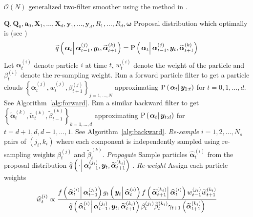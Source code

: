 \documentclass[notitlepage]{article}
\newcommand\StateXX{\Statex\hspace{\algorithmicindent}\hspace{\algorithmicindent}}
\renewcommand{\vec}[1]{\bm{#1}}
\newcommand{\mat}[1]{\mathbf{#1}}
\newcommand{\Lbrace}[1]{\left\{ #1\right\}}
\newcommand{\Lparen}[1]{\left( #1\right)}
\newcommand{\Cond}[2]{\left. #1 \vphantom{#2} \right\vert  #2}
\newcommand{\Prob}{\text{P}}
\newcommand{\optor}[2]{#1\Lparen{#2}}
\newcommand{\optorC}[3]{\optor{#1}{\Cond{#2}{#3}}}
\newcommand{\propC}[2]{\optorC{\Prob}{#1}{#2}}
\newcommand{\gFunc}[3]{\optorC{g_{#3}}{#1}{#2}}
\newcommand{\fFunc}[2]{\optorC{f}{#1}{#2}}
\newcommand{\IDAproxC}[2]{\optorC{\widetilde{q}}{#1}{#2}}
\newcommand{\partic}[3]{#1_{#2}^{\Lparen{#3}}}
\newcommand{\particB}[3]{\widetilde{#1}_{#2}^{\Lparen{#3}}}
\newcommand{\particS}[3]{\widehat{#1}_{#2}^{\Lparen{#3}}}
\newcommand{\bigO}[1]{\mathcal{O}\Lparen{#1}}
\newcommand{\nPart}{N}
\newcommand{\nPeriods}{d}
\begin{document}
\newpage

\begin{algorithm}[H]
\caption{$\bigO{\nPart}$ generalized two-filter smoother using the method in \cite{fearnhead10}.}\label{alg:ONsmoother}
\begin{algorithmic}[1]\raggedright
\INPUT
\Statex $\mat{Q},\mat{Q}_0,\vec{a}_0,\mat{X}_1,\dots,\mat{X}_d,\vec{y}_1,\dots,\vec{y}_d,R_1,\dots,R_d,\vec{\omega}$
%
\Statex Proposal distribution which optimally is (see \citet[page 453]{fearnhead10})
\Statex \begin{equation}
	\IDAproxC{\vec{\alpha}_t}{\partic{\vec{\alpha}}{t-1}{j},\vec{y}_t, \particB{\vec{\alpha}}{t+1}{k}} =
%
	\propC{\vec{\alpha}_t}{\partic{\vec{\alpha}}{t-1}{j},\vec{y}_t, \particB{\vec{\alpha}}{t+1}{k}}
\end{equation}
%
%
\Statex Let $\partic{\vec{\alpha}}{t}{i}$ denote particle $i$ at time $t$, $\partic{w}{t}{i}$ denote the weight of the particle and $\partic{\beta}{t}{i}$ denote the re-sampling weight.
%
\State Run a forward particle filter to get a particle clouds %
	$\Lbrace{\partic{\vec{\alpha}}{t}{j}, \partic{w}{t}{j}, \partic{\beta}{t + 1}{j}}_{j=1,\dots,\nPart}$ %
	approximating $\propC{\vec{\alpha}_t}{\vec{y}_{1:t}}$ for $t = 0, 1, \dots, \nPeriods$. See Algorithm~\ref{alg:forward}.
\EndProcedure
%
\State Run a similar backward filter to get %
	$\Lbrace{\particB{\vec{\alpha}}{t}{k}, \particB{w}{t}{k}, \particB{\beta}{t - 1}{k}}_{k=1,\dots,\nPeriods}$  %
	approximating $\propC{\vec{\alpha}_t}{\vec{y}_{t:\nPeriods}}$ for $t = \nPeriods + 1, \nPeriods, \nPeriods - 1, \dots, 1$. See Algorithm~\ref{alg:backward}.
\EndProcedure
%
\For{$t=1,\dots, \nPart$}
\StateXX \emph{Re-sample}
\State $i=1,2,\dots,\nPart_s$ pairs of $\Lparen{j_i, k_i}$ where each component is independently sampled using re-sampling weights $\partic{\beta}{t}{j}$ and $\particB{\beta}{t}{k}$.
%
\StateXX \emph{Propagate}
\State Sample particles $\particS{\vec{\alpha}}{t}{i}$ from the proposal distribution %
	$\IDAproxC{\cdot}{\partic{\vec{\alpha}}{t-1}{j_i},\vec{y}_t, \particB{\vec{\alpha}}{t + 1}{k_i}}$%
.%
\StateXX \emph{Re-weight}
\State Assign each particle weights
\StateXX \begin{equation}\label{eqn:combineWeight}
 \particS{w}{t}{i} \propto \frac{
 	\fFunc{\particS{\vec{\alpha}}{t}{i}}{\partic{\vec{\alpha}}{t - 1}{j_i}}
 	\gFunc{\vec{y}_t}{\particS{\vec{\alpha}}{t}{i}}{t}
 	\fFunc{\particB{\vec{\alpha}}{t + 1}{k_i}}{\particS{\vec{\alpha}}{t}{i}}
 	\partic{w}{t - 1}{j_i}\particB{w}{t + 1}{k_i}
 	}{ %
 	\IDAproxC{\particS{\vec{\alpha}}{t}{i}}{\partic{\vec{\alpha}}{t-1}{j_i},\vec{y}_t, \particB{\vec{\alpha}}{t+1}{k_i}}
 	\partic{\beta}{t}{j_i}\particB{\beta}{t}{k_i}\gamma_{t +1}\Lparen{\particB{\vec{\alpha}}{t+1}{k_i}}
 	} %
\end{equation}
\EndFor
\EndProcedure
\end{algorithmic}
\end{algorithm}
\end{document}
